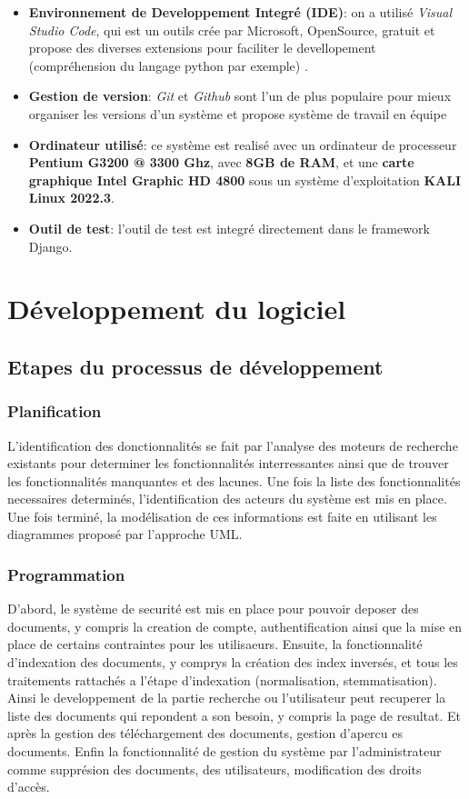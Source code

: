 \begin{itemize}
    \item \textbf{Environnement de Developpement Integré (IDE)}: on a utilisé \emph{Visual Studio Code}, qui est un outils crée par Microsoft, OpenSource, gratuit et propose des diverses extensions pour faciliter le devellopement (compréhension du langage python par exemple) \citep*{vscode}.
    \item \textbf{Gestion de version}: \emph{Git} et \emph{Github} sont l'un de plus populaire pour mieux organiser les versions d'un système et propose système de travail en équipe \citep*{git, github}
    \item \textbf{Ordinateur utilisé}: ce système est realisé avec un ordinateur de processeur \textbf{Pentium G3200 @ 3300 Ghz}, avec \textbf{8GB de RAM}, et une \textbf{carte graphique Intel Graphic HD 4800} sous un système d'exploitation \textbf{KALI Linux 2022.3}.
    \item \textbf{Outil de test}: l'outil de test est integré directement dans le framework Django.
\end{itemize}

\section{Développement du logiciel}
\subsection{Etapes du processus de développement}
\subsubsection{Planification}
L'identification des donctionnalités se fait par l'analyse des moteurs de recherche existants pour determiner les fonctionnalités interressantes ainsi que de trouver les fonctionnalités manquantes et des lacunes. Une fois la liste des fonctionnalités necessaires determinés, l'identification des acteurs du système est mis en place. Une fois terminé, la modélisation de ces informations est faite en utilisant les diagrammes proposé par l'approche UML\@.

\subsubsection{Programmation}
D'abord, le système de securité est mis en place pour pouvoir deposer des documents, y compris la creation de compte, authentification ainsi que la mise en place de certains contraintes pour les utilisaeurs. Ensuite, la fonctionnalité d'indexation des documents, y comprys la création des index inversés, et tous les traitements rattachés a l'étape d'indexation (normalisation, stemmatisation). Ainsi le developpement de la partie recherche ou l'utilisateur peut recuperer la liste des documents qui repondent a son besoin, y compris la page de resultat. Et après la gestion des téléchargement des documents, gestion d'apercu es documents. Enfin la fonctionnalité de gestion du système par l'administrateur comme supprésion des documents, des utilisateurs, modification des droits d'accès.

